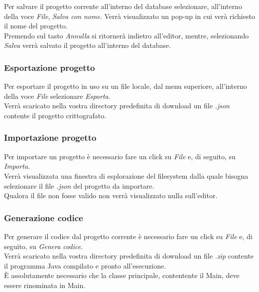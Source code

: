 			Per salvare il progetto corrente all'interno del database selezionare, all'interno della voce \emph{File}, \emph{Salva con nome}.
			Verrà visualizzato un pop-up in cui verà richiesto il nome del progetto.\\
			Premendo sul tasto \emph{Annulla} si ritornerà indietro all'editor, mentre, selezionando \emph{Salva} verrà salvato il progetto all'interno del database.
		\subsubsection{Esportazione progetto}
			Per esportare il progetto in uso su un file locale, dal menu superiore, all'interno della voce \textit{File} selezionare \textit{Esporta}.\\
			Verrà scaricato nella vostra directory predefinita di download un file \emph{.json} contente il progetto crittografato.\\
		\subsubsection{Importazione progetto}
			Per importare un progetto è necessario fare un click su \textit{File} e, di seguito, su \emph{Importa}.\\
			Verrà visualizzata una finestra di esplorazione del filesystem dalla quale bisogna selezionare il file \emph{.json} del progetto da importare.\\
			Qualora il file non fosse valido non verrà visualizzato nulla sull'editor.\\
		\subsubsection{Generazione codice}
			Per generare il codice dal progetto corrente è necessario fare un click su \textit{File} e, di seguito, su \emph{Genera codice}.\\
			Verrà scaricato nella vostra directory predefinita di download un file \emph{.zip} contente il programma Java compilato e pronto all'esecuzione.\\
			È assolutamente necessario che la classe principale, contentente il Main, deve essere rinominata in Main.\\
